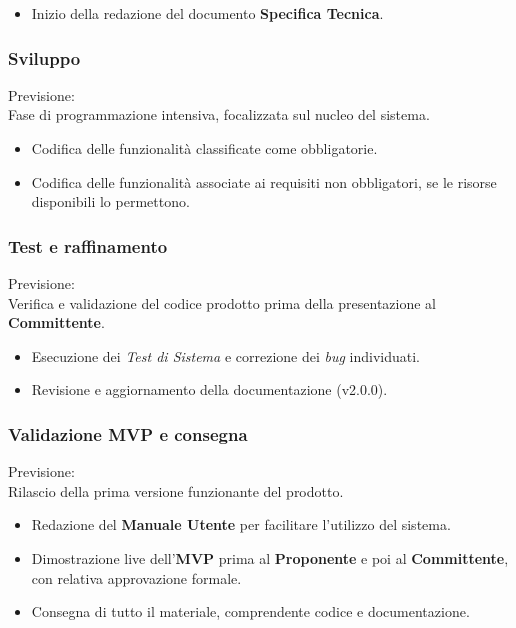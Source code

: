 \documentclass[12pt, a4paper]{article}
\begin{document}
{\begin{itemize}
    \item Inizio della redazione del documento \textbf{Specifica Tecnica}.
\end{itemize}


\subsubsection{Sviluppo}
Previsione: \\
Fase di programmazione intensiva, focalizzata sul nucleo del sistema.
\begin{itemize}
    \item Codifica delle funzionalità classificate come obbligatorie.
    \item Codifica delle funzionalità associate ai requisiti non obbligatori, se le risorse disponibili lo permettono.
\end{itemize}

\subsubsection{Test e raffinamento}
Previsione: \\
Verifica e validazione del codice prodotto prima della presentazione al \textbf{Committente}.
\begin{itemize}
    \item Esecuzione dei \textit{Test di Sistema} e correzione dei \textit{bug} individuati.
    \item Revisione e aggiornamento della documentazione (v2.0.0).
\end{itemize}

\subsubsection{Validazione \textbf{MVP} e consegna}
Previsione: \\
Rilascio della prima versione funzionante del prodotto.
\begin{itemize}
    \item Redazione del \textbf{Manuale Utente} per facilitare l'utilizzo del sistema.
    \item Dimostrazione live dell'\textbf{MVP} prima al \textbf{Proponente} e poi al \textbf{Committente}, con relativa approvazione formale.
    \item Consegna di tutto il materiale, comprendente codice e documentazione.
\end{itemize}


}
\end{document}
